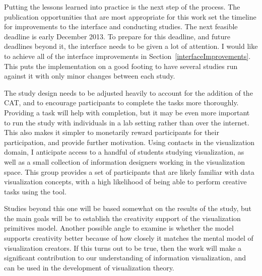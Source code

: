 \label{futureWork}

Putting the lessons learned into practice is the next step of the process.
The publication opportunities that are most appropriate for this work set the timeline for improvements to the interface and conducting studies.
The next feasible deadline is early December 2013.
To prepare for this deadline, and future deadlines beyond it, the interface needs to be given a lot of attention.
I would like to achieve all of the interface improvements in Section~\ref{interfaceImprovements}.
This puts the implementation on a good footing to have several studies run against it with only minor changes between each study.

The study design needs to be adjusted heavily to account for the addition of the CAT, and to encourage participants to complete the tasks more thoroughly.
Providing a task will help with completion, but it may be even more important to run the study with individuals in a lab setting rather than over the internet.
This also makes it simpler to monetarily reward participants for their participation, and provide further motivation.
Using contacts in the visualization domain, I anticipate access to a handful of students studying visualization, as well as a small collection of information designers working in the visualization space.
This group provides a set of participants that are likely familiar with data visualization concepts, with a high likelihood of being able to perform creative tasks using the tool.

Studies beyond this one will be based somewhat on the results of the study, but the main goals will be to establish the creativity support of the visualization primitives model.
Another possible angle to examine is whether the model supports creativity better because of how closely it matches the mental model of visualization creators.
If this turns out to be true, then the work will make a significant contribution to our understanding of information visualization, and can be used in the development of visualization theory.